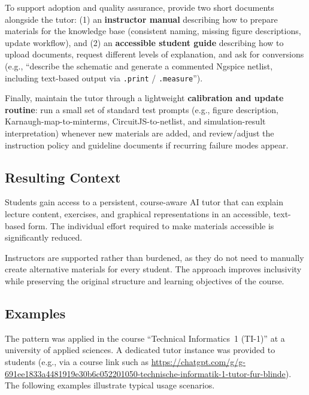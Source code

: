 To support adoption and quality assurance, provide two short documents alongside the tutor:
(1) an \textbf{instructor manual} describing how to prepare materials for the knowledge base (consistent naming, missing figure descriptions, update workflow), and
(2) an \textbf{accessible student guide} describing how to upload documents, request different levels of explanation, and ask for conversions (e.g., ``describe the schematic and generate a commented Ngspice netlist, including text-based output via \texttt{.print} / \texttt{.measure}'').

Finally, maintain the tutor through a lightweight \textbf{calibration and update routine}: run a small set of standard test prompts (e.g., figure description, Karnaugh-map-to-minterms, CircuitJS-to-netlist, and simulation-result interpretation) whenever new materials are added, and review/adjust the instruction policy and guideline documents if recurring failure modes appear.

\subsection*{Resulting Context}

Students gain access to a persistent, course-aware AI tutor that can explain lecture content, exercises, and graphical representations in an accessible, text-based form. The individual effort required to make materials accessible is significantly reduced.

Instructors are supported rather than burdened, as they do not need to manually create alternative materials for every student. The approach improves inclusivity while preserving the original structure and learning objectives of the course.

\subsection*{Examples}

The pattern was applied in the course ``Technical Informatics~1 (TI-1)'' at a university of applied sciences. A dedicated tutor instance was provided to students (e.g., via a course link such as \url{https://chatgpt.com/g/g-691ee1833a4481919e30b6c052201050-technische-informatik-1-tutor-fur-blinde}). The following examples illustrate typical usage scenarios.

